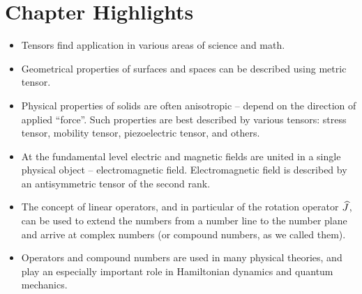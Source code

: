 \section*{Chapter Highlights}
{\chhc
  \it
  \small
\begin{itemize}
\item Tensors find application in various areas of science and math.
\item Geometrical properties of surfaces and spaces can be described
  using metric tensor.
\item Physical properties of solids are often anisotropic -- depend on
  the direction of applied ``force''. Such properties are best
  described by various tensors: stress tensor, mobility tensor,
  piezoelectric tensor, and others.
\item At the fundamental level electric and magnetic fields are united
  in a single physical object -- electromagnetic field. Electromagnetic
  field is described by an antisymmetric tensor of the second rank.
\item The concept of linear operators, and in particular of the
  rotation operator $\widehat{J}$, can be used to extend the numbers from a
  number line to the number plane and arrive at complex numbers (or
  compound numbers, as we called them).
\item Operators and compound numbers are used in many physical
  theories, and play an especially important role in Hamiltonian
  dynamics and quantum mechanics.
\end{itemize}

}
